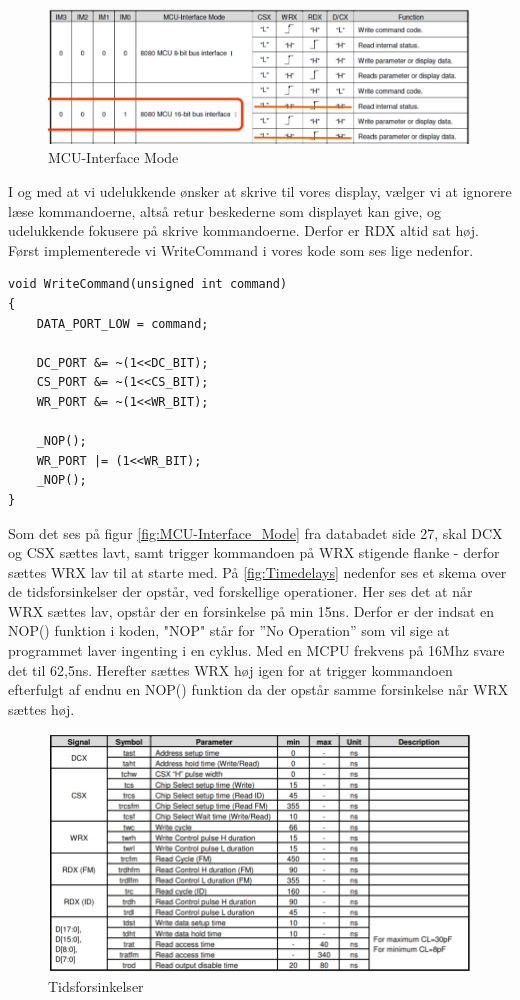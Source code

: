 \begin{figure}[H]
	\centering
	\includegraphics[width = 400pt]{Img/MCU-Interface_Mode.png}
	\caption{MCU-Interface Mode}
	\label{fig:MCU-Interface_Mode}
\end{figure}

I og med at vi udelukkende ønsker at skrive til vores display, vælger vi at ignorere læse kommandoerne, altså retur beskederne som displayet kan give, og udelukkende fokusere på skrive kommandoerne. Derfor er RDX altid sat høj.
Først implementerede vi WriteCommand i vores kode som ses lige nedenfor.


\begin{lstlisting}
void WriteCommand(unsigned int command)
{
	DATA_PORT_LOW = command;

	DC_PORT &= ~(1<<DC_BIT);
	CS_PORT &= ~(1<<CS_BIT);
	WR_PORT &= ~(1<<WR_BIT);
	
	_NOP();
	WR_PORT |= (1<<WR_BIT);
	_NOP();
}

\end{lstlisting}


Som det ses på figur \autoref{fig:MCU-Interface_Mode} fra databadet\cite{man:ILI9341} side 27, skal DCX og CSX sættes lavt, samt trigger kommandoen på WRX stigende flanke - derfor sættes WRX lav til at starte med. På \autoref{fig:Timedelays} nedenfor ses et skema over de tidsforsinkelser der opstår, ved forskellige operationer. Her ses det at når WRX sættes lav, opstår der en forsinkelse på min 15ns. Derfor er der indsat en NOP() funktion i koden, "NOP" står for ”No Operation” som vil sige at programmet laver ingenting i en cyklus. Med en MCPU frekvens på 16Mhz svare det til 62,5ns. Herefter sættes WRX høj igen for at trigger kommandoen efterfulgt af endnu en NOP() funktion da der opstår samme forsinkelse når WRX sættes høj.

\begin{figure}[H]
	\centering
	\includegraphics[width = 450pt]{Img/Timedelays.png}
	\caption{Tidsforsinkelser}
	\label{fig:Timedelays}
\end{figure}



